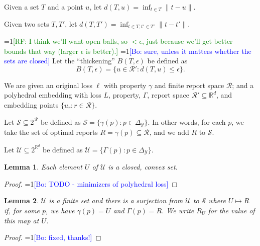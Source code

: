 \documentclass{article}
\newcommand{\Comments}{1}
\newcommand{\mynote}[2]{\ifnum\Comments=1\textcolor{#1}{#2}\fi}
\newcommand{\raf}[1]{\mynote{green}{[RF: #1]}}
\newcommand{\bo}[1]{\mynote{blue}{[Bo: #1]}}
\newcommand{\reals}{\mathbb{R}}
\newcommand{\R}{\mathcal{R}}
\newcommand{\Y}{\mathcal{Y}}
\newtheorem{lemma}{Lemma}
\begin{document}
Given a set $T$ and a point $u$, let $d(T,u) = \inf_{t \in T} \|t-u\|$.

Given two sets $T,T'$, let $d(T,T') = \inf_{t\in T, t' \in T'} \|t-t'\|$.

\raf{I think we'll want open balls, so $< \epsilon$, just because we'll get better bounds that way (larger $\epsilon$ is better).} \bo{sure, unless it matters whether the sets are closed}
Let the ``thickening'' $B(T,\epsilon)$ be defined as
  \[ B(T,\epsilon) = \{u \in \R' : d(T,u) \leq \epsilon \} . \]

We are given an original loss $\ell$ with property $\gamma$ and finite report space $\R$; and a polyhedral embedding with loss $L$, property, $\Gamma$, report space $\R' \subseteq \reals^d$, and embedding points $\{u_r : r \in \R\}$.


Let $\mathcal{S} \subseteq 2^{\R}$ be defined as $\mathcal{S} = \{\gamma(p) : p \in \Delta_{\Y}\}$.
In other words, for each $p$, we take the set of optimal reports $R = \gamma(p) \subseteq \R$, and we add $R$ to $\mathcal{S}$.

Let $\mathcal{U} \subseteq 2^{\reals^d}$ be defined as $\mathcal{U} = \{\Gamma(p) : p \in \Delta_{\Y}\}$.

\begin{lemma} \label{lemma:U-convex-closed}
  Each element $U$ of $\mathcal{U}$ is a closed, convex set.
\end{lemma}
\begin{proof}
  \bo{TODO - minimizers of polyhedral loss}
\end{proof}

\begin{lemma} \label{lemma:U-surject}
  $\mathcal{U}$ is a finite set and there is a surjection from $\mathcal{U}$ to $\mathcal{S}$ where $U \mapsto R$ if, for some $p$, we have $\gamma(p) = U$ and $\Gamma(p) = R$.
  We write $R_U$ for the value of this map at $U$.
\end{lemma}
\begin{proof}
  \bo{fixed, thanks!}
\end{proof}
\end{document}
